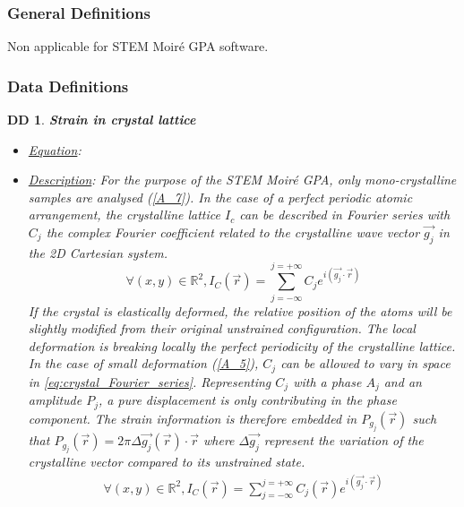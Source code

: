 \documentclass[12pt]{article}
\newcommand{\progname}{STEM Moir{\'e} GPA}
\newtheorem{DD}{DD}
\begin{document}
\subsubsection{General Definitions}\label{sec_gendef}

Non applicable for \progname{} software.

\subsubsection{Data Definitions}\label{sec_datadef}

\renewcommand{\labelitemi}{$\star$}

\begin{DD}
\label{DD_1}
\noindent\colorbox{shadecolorDD}{\normalfont \textbf{Strain in crystal lattice}}
\normalfont
\begin{itemize}
\item \underline{Equation}: 
\item \underline{Description}: For the purpose of the STEM Moir{\'e} GPA, only mono-crystalline samples are analysed (\cref{A_7}). In the case of a perfect periodic atomic arrangement, the crystalline lattice $I_c$ can be described in Fourier series with $C_j$ the complex Fourier coefficient related to the crystalline wave vector $\vec{g_j}$ in the 2D Cartesian system.
\begin{equation}
\forall (x,y) \in \mathbb{R}^{2},I_C(\vec{r})=\sum_{j=-\infty}^{j=+\infty}C_je^{i(\vec{g_j}\cdot\vec{r})}
\label{eq:crystal_Fourier_series}
\end{equation}
If the crystal is elastically deformed, the relative position of the atoms will be slightly modified from their original unstrained configuration. The local deformation is breaking locally the perfect periodicity of the crystalline lattice. In the case of small deformation (\cref{A_5}), $C_j$ can be allowed to vary in space in \cref{eq:crystal_Fourier_series}. Representing $C_j$ with a phase $A_j$ and an amplitude $P_j$, a pure displacement is only contributing in the phase component. The strain information is therefore embedded in $P_{g_{j}}(\vec{r})$ such that $P_{g_{j}}(\vec{r})=2\pi\Delta \overrightarrow{g_{j}}(\vec{r})\cdot\vec{r}$ where $\Delta \overrightarrow{g_j}$ represent the variation of the crystalline vector compared to its unstrained state.
\begin{equation}
\begin{gathered}
\forall (x,y) \in \mathbb{R}^{2},I_C(\vec{r})=\sum_{j=-\infty}^{j=+\infty}C_j(\vec{r})e^{i(\vec{g_j}\cdot\vec{r})} \\

\end{gathered}
\end{equation}
\end{itemize}
\end{DD}
\end{document}
